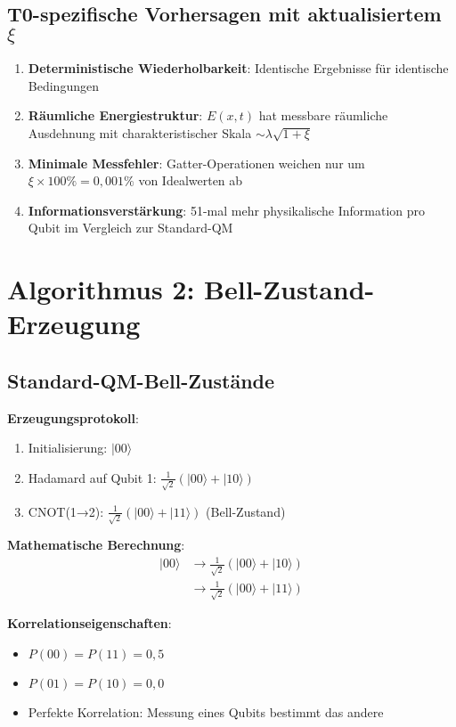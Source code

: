 \documentclass[12pt,a4paper]{article}
\newcommand{\Efield}{E}
\begin{document}
	\subsection{T0-spezifische Vorhersagen mit aktualisiertem $\xi$}
	
	\begin{enumerate}
		\item \textbf{Deterministische Wiederholbarkeit}: Identische Ergebnisse für identische Bedingungen
		\item \textbf{Räumliche Energiestruktur}: $\Efield(x,t)$ hat messbare räumliche Ausdehnung mit charakteristischer Skala $\sim \lambda \sqrt{1+\xi}$
		\item \textbf{Minimale Messfehler}: Gatter-Operationen weichen nur um $\xi \times 100\% = 0,001\%$ von Idealwerten ab
		\item \textbf{Informationsverstärkung}: 51-mal mehr physikalische Information pro Qubit im Vergleich zur Standard-QM
	\end{enumerate}
	
	\section{Algorithmus 2: Bell-Zustand-Erzeugung}
	
	\subsection{Standard-QM-Bell-Zustände}
	
	\textbf{Erzeugungsprotokoll}:
	\begin{enumerate}
		\item Initialisierung: $|00\rangle$
		\item Hadamard auf Qubit 1: $\frac{1}{\sqrt{2}}(|00\rangle + |10\rangle)$
		\item CNOT(1→2): $\frac{1}{\sqrt{2}}(|00\rangle + |11\rangle)$ (Bell-Zustand)
	\end{enumerate}
	
	\textbf{Mathematische Berechnung}:
	\begin{align}
		|00\rangle &\rightarrow \frac{1}{\sqrt{2}}(|00\rangle + |10\rangle) \\
		&\rightarrow \frac{1}{\sqrt{2}}(|00\rangle + |11\rangle)
	\end{align}
	
	\textbf{Korrelationseigenschaften}:
	\begin{itemize}
		\item $P(00) = P(11) = 0,5$
		\item $P(01) = P(10) = 0,0$
		\item Perfekte Korrelation: Messung eines Qubits bestimmt das andere
	\end{itemize}
	
\end{document}

